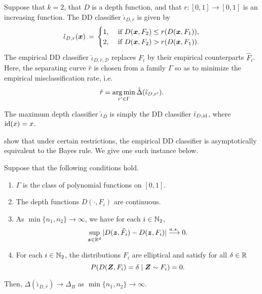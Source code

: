 \begin{definition}[DD classifier]
    Suppose that $k = 2$, that $D$ is a depth function, and that $r\colon [0,
    1] \to [0, 1]$ is an increasing function. The DD classifier
    $\hat{\iota}_{D, r}$ is given by
    \begin{equation}
        \hat{\iota}_{D, r}(\bm{x}) \,=\, \begin{cases}
            1, &\text{ if } D(\bm{x}, F_2) \leq r(D(\bm{x}, F_1)), \\
            2, &\text{ if } D(\bm{x}, F_2) >    r(D(\bm{x}, F_1)).
        \end{cases}
    \end{equation}
    The empirical DD classifier $\hat{\iota}_{D, \hat{r}, \mathscr{D}}$
    replaces $F_i$ by their empirical counterparts $\hat{F}_i$. Here, the
    separating curve $\hat{r}$ is chosen from a family $\Gamma$ so as to
    minimize the empirical misclassification rate, i.e.
    \begin{equation}
        \hat{r} = \operatorname*{arg\,min}_{r' \in \Gamma} \hat{\Delta}(\hat{\iota}_{D, r'}).
    \end{equation}
\end{definition}
\begin{remark}
    The maximum depth classifier $\hat{\iota}_D$ is simply the DD classifier
    $\hat{\iota}_{D, \operatorname{id}}$, where $\operatorname{id}(x) = x$.
\end{remark}

\textcite{li-albertos-liu-2012} show that under certain restrictions, the
empirical DD classifier is asymptotically equivalent to the Bayes rule. We
give one such instance below.

\begin{lemma}
    Suppose that the following conditions hold.
    \vspace{-1em}
    \begin{enumerate}[itemsep = -0.2em]
        \item $\Gamma$ is the class of polynomial functions on $[0, 1]$.
        \item The depth functions $D(\cdot, F_i)$ are continuous.
        \item As $\min\{n_1, n_2\} \to \infty$, we have for each $i \in \mathbb{N}_2$,
        \begin{equation}
            \sup_{\bm{z} \in \mathbb{R}^d} |D(\bm{z}, \hat{F}_i) - D(\bm{z}, F_i)| \overset{a.s.\,}{\longrightarrow} 0.
        \end{equation}
        \item For each $i \in \mathbb{N}_2$, the distributions $F_i$ are elliptical
        and satisfy for all $\delta \in \mathbb{R}$
        \begin{equation}
            P(D(\bm{Z}, F_i) = \delta \mid \bm{Z} \sim F_i) = 0.
        \end{equation}
    \end{enumerate}
    Then, $\Delta(\hat{\iota}_{D, \hat{r}}) \to \Delta_B$ as $\min\{n_1, n_2\}
    \to \infty$.
\end{lemma}

